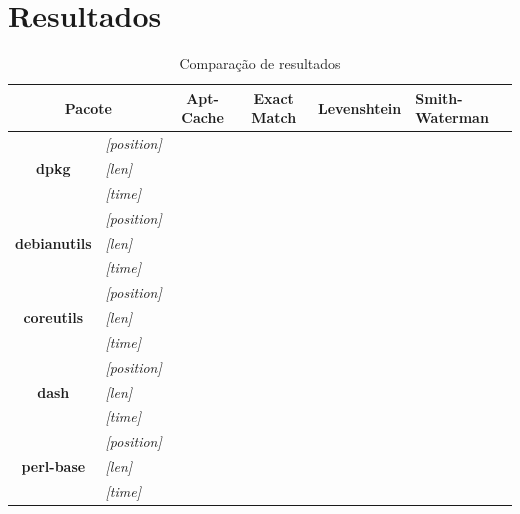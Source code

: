 \chapter{Resultados} %
\label{cha:resultados}

\begin{table}[htbp]
\caption{Comparação de resultados}
\begin{tabular}{|c|l|c|c|c|p{2cm}|}
\hline
\multicolumn{ 2}{|c|}{\textbf{Pacote}} & \textbf{Apt-Cache} & \textbf{Exact Match} & \textbf{Levenshtein} & \textbf{Smith-Waterman} \\ \hline\hline
\multicolumn{ 1}{|c|}{} & \textit{[position]} &  &  &  &  \\ \cline{ 2- 6}
\multicolumn{ 1}{|c|}{\textbf{dpkg}} & \textit{[len]} &  &  &  &  \\ \cline{ 2- 6}
\multicolumn{ 1}{|c|}{} & \textit{[time]} &  &  &  &  \\ \hline
\multicolumn{ 1}{|c|}{} & \textit{[position]} &  &  &  &  \\ \cline{ 2- 6}
\multicolumn{ 1}{|c|}{\textbf{debianutils}} & \textit{[len]} &  &  &  &  \\ \cline{ 2- 6}
\multicolumn{ 1}{|c|}{} & \textit{[time]} &  &  &  &  \\ \hline
\multicolumn{ 1}{|c|}{} & \textit{[position]} &  &  &  &  \\ \cline{ 2- 6}
\multicolumn{ 1}{|c|}{\textbf{coreutils}} & \textit{[len]} &  &  &  &  \\ \cline{ 2- 6}
\multicolumn{ 1}{|c|}{} & \textit{[time]} &  &  &  &  \\ \hline
\multicolumn{ 1}{|c|}{} & \textit{[position]} &  &  &  &  \\ \cline{ 2- 6}
\multicolumn{ 1}{|c|}{\textbf{dash}} & \textit{[len]} &  &  &  &  \\ \cline{ 2- 6}
\multicolumn{ 1}{|c|}{} & \textit{[time]} &  &  &  &  \\ \hline
\multicolumn{ 1}{|c|}{} & \textit{[position]} &  &  &  &  \\ \cline{ 2- 6}
\multicolumn{ 1}{|c|}{\textbf{perl-base}} & \textit{[len]} &  &  &  &  \\ \cline{ 2- 6}
\multicolumn{ 1}{|c|}{} & \textit{[time]} &  &  &  &  \\ \hline
\end{tabular}
\label{tab:comparacao}
\end{table}

